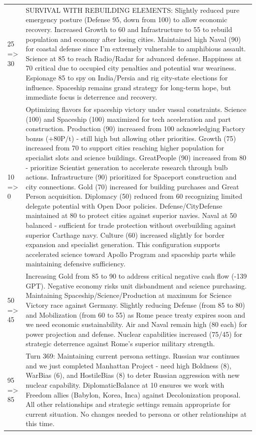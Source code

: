 \begin{longtable}{p{}p{}}
25 => 30 & SURVIVAL WITH REBUILDING ELEMENTS: Slightly reduced pure emergency posture (Defense 95, down from 100) to allow economic recovery. Increased Growth to 60 and Infrastructure to 55 to rebuild population and economy after losing cities. Maintained high Naval (90) for coastal defense since I'm extremely vulnerable to amphibious assault. Science at 85 to reach Radio/Radar for advanced defense. Happiness at 70 critical due to occupied city penalties and potential war weariness. Espionage 85 to spy on India/Persia and rig city-state elections for influence. Spaceship remains grand strategy for long-term hope, but immediate focus is deterrence and recovery. \\
10 => 0 & Optimizing flavors for spaceship victory under vassal constraints. Science (100) and Spaceship (100) maximized for tech acceleration and part construction. Production (90) increased from 100 acknowledging Factory bonus (+80P/t) - still high but allowing other priorities. Growth (75) increased from 70 to support cities reaching higher population for specialist slots and science buildings. GreatPeople (90) increased from 80 - prioritize Scientist generation to accelerate research through bulb actions. Infrastructure (90) prioritized for Spaceport construction and city connections. Gold (70) increased for building purchases and Great Person acquisition. Diplomacy (50) reduced from 60 recognizing limited delegate potential with Open Door policies. Defense/CityDefense maintained at 80 to protect cities against superior navies. Naval at 50 balanced - sufficient for trade protection without overbuilding against superior Carthage navy. Culture (60) increased slightly for border expansion and specialist generation. This configuration supports accelerated science toward Apollo Program and spaceship parts while maintaining defensive sufficiency. \\
50 => 45 & Increasing Gold from 85 to 90 to address critical negative cash flow (-139 GPT). Negative economy risks unit disbandment and science purchasing. Maintaining Spaceship/Science/Production at maximum for Science Victory race against Germany. Slightly reducing Defense (from 85 to 80) and Mobilization (from 60 to 55) as Rome peace treaty expires soon and we need economic sustainability. Air and Naval remain high (80 each) for power projection and defense. Nuclear capabilities increased (75/45) for strategic deterrence against Rome's superior military strength. \\
95 => 85 & Turn 369: Maintaining current persona settings. Russian war continues and we just completed Manhattan Project - need high Boldness (8), WarBias (6), and HostileBias (8) to deter Russian aggression with new nuclear capability. DiplomaticBalance at 10 ensures we work with Freedom allies (Babylon, Korea, Inca) against Decolonization proposal. All other relationships and strategic settings remain appropriate for current situation. No changes needed to persona or other relationships at this time. \\

\end{longtable}
